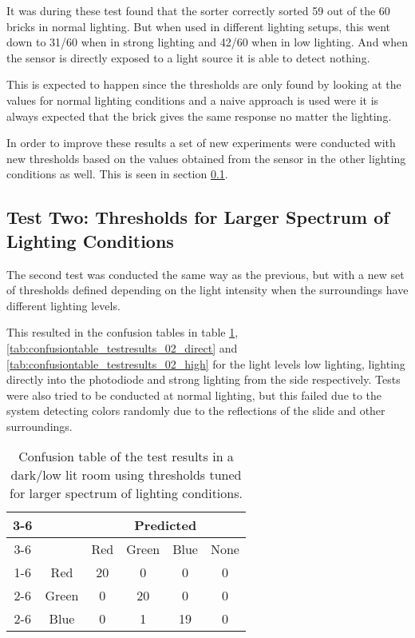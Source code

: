 It was during these test found that the sorter correctly sorted 59 out of the 60 bricks in normal lighting.
But when used in different lighting setups, this went down to 31/60 when in strong lighting and 42/60 when in low lighting.
And when the sensor is directly exposed to a light source it is able to detect nothing.

This is expected to happen since the thresholds are only found by looking at the values for normal lighting conditions and a naive approach is used were  it is always expected that the brick gives the same response no matter the lighting.

In order to improve these results a set of new experiments were conducted with new thresholds based on the values obtained from the sensor in the other lighting conditions as well.
This is seen in section \ref{sec:testtwo}.



\subsection{Test Two: Thresholds for Larger Spectrum of Lighting Conditions}
\label{sec:testtwo}

The second test was conducted the same way as the previous, but with a new set of thresholds defined depending on the light intensity when the surroundings have different lighting levels.

This resulted in the confusion tables in table \ref{tab:confusiontable_testresults_02_low}, \ref{tab:confusiontable_testresults_02_direct} and \ref{tab:confusiontable_testresults_02_high} for the light levels low lighting, lighting directly into the photodiode and strong lighting from the side respectively.
Tests were also tried to be conducted at normal lighting, but this failed due to the system detecting colors randomly due to the reflections of the slide and other surroundings.



\begin{table}[H]
\centering
\begin{tabular}{c c|c|c|c|c|}
\cline{3-6}
 & &  \multicolumn{4}{|c|}{Predicted} \\ \cline{3-6}
 & & Red & Green & Blue & None \\ \cline{1-6} 
\multicolumn{1}{ |c|  }{\multirow{3}{*}{Actual}} & Red & 20 & 0 & 0 & 0 \\ \cline{2-6}
\multicolumn{1}{ |c|  }{} & Green & 0 & 20 & 0 & 0 \\ \cline{2-6}
\multicolumn{1}{ |c|  }{} & Blue & 0 & 1 & 19 & 0 \\ \hline
\end{tabular}
\caption[Confusion table in low lightning, test two.]{Confusion table of the test results in a dark/low lit room using thresholds tuned for larger spectrum of lighting conditions.}
\label{tab:confusiontable_testresults_02_low}
\end{table}


